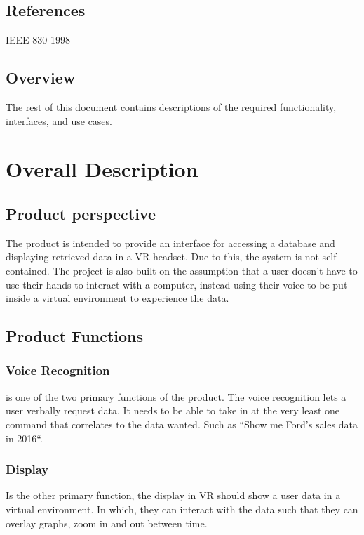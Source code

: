 \documentclass[onecolumn, draftclsnofoot,10pt, compsoc]{IEEEtran}
\begin{document}
    \subsection{References}
        IEEE 830-1998

    \subsection{Overview}
        The rest of this document contains descriptions of the required functionality, interfaces, and use cases.
    \section{Overall Description}

    \subsection{Product perspective}
        The product is intended to provide an interface for accessing a database and displaying retrieved data in a VR headset. Due to this, the system is not self-contained. The project is also built on the assumption that a user doesn’t have to use their hands to interact with a computer, instead using their voice to be put inside a virtual environment to experience the data.

    \subsection{Product Functions}

        \subsubsection{Voice Recognition}
            is one of the two primary functions of the product. The voice recognition lets a user verbally request data. It needs to be able to take in at the very least one command that correlates to the data wanted. Such as ``Show me Ford’s sales data in 2016``.

        \subsubsection{Display}
            Is the other primary function, the display in VR should show a user data in a virtual environment. In which, they can interact with the data such that they can overlay graphs, zoom in and out between time.
\end{document}
